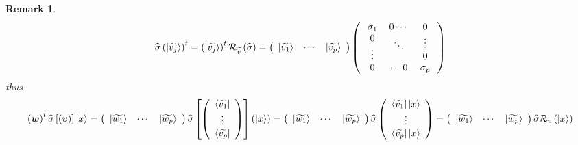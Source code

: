 \documentclass[aps,preprint]{revtex4}
\newtheorem{remark}[theorem]{Remark}
\begin{document}
\begin{remark}
\begin{equation}
\widehat{\sigma }\left( \left\vert \widetilde{v_{j}}\right\rangle \right)
^{t}=\left( \left\vert \widetilde{v_{j}}\right\rangle \right) ^{t}\mathcal{R}%
_{\widetilde{v}}\left( \widehat{\sigma }\right) =\left( 
\begin{array}{ccc}
\left\vert \widetilde{v_{1}}\right\rangle & \cdots & \left\vert \widetilde{%
v_{p}}\right\rangle%
\end{array}%
\right) \left( 
\begin{array}{ccc}
\sigma _{1} & 0\cdots & 0 \\ 
\begin{array}{c}
0 \\ 
\vdots%
\end{array}
& \ddots & 
\begin{array}{c}
\vdots \\ 
0%
\end{array}
\\ 
0 & \cdots 0 & \sigma _{p}%
\end{array}%
\right)
\end{equation}%
thus 
\begin{equation}
\left( \boldsymbol{w}\right) ^{t}\widehat{\sigma }\left[ \left( \boldsymbol{v%
}\right) \right] \left\vert x\right\rangle =\left( 
\begin{array}{ccc}
\left\vert \widetilde{w_{1}}\right\rangle & \cdots & \left\vert \widetilde{%
w_{p}}\right\rangle%
\end{array}%
\right) \widehat{\sigma }\left[ \left( 
\begin{array}{c}
\left\langle \widetilde{v_{1}}\right\vert \\ 
\vdots \\ 
\left\langle \widetilde{v_{p}}\right\vert%
\end{array}%
\right) \right] \left( \left\vert x\right\rangle \right) =\left( 
\begin{array}{ccc}
\left\vert \widetilde{w_{1}}\right\rangle & \cdots & \left\vert \widetilde{%
w_{p}}\right\rangle%
\end{array}%
\right) \widehat{\sigma }\left( 
\begin{array}{c}
\left\langle \widetilde{v_{1}}\right\vert \left\vert x\right\rangle \\ 
\vdots \\ 
\left\langle \widetilde{v_{p}}\right\vert \left\vert x\right\rangle%
\end{array}%
\right) =\left( 
\begin{array}{ccc}
\left\vert \widetilde{w_{1}}\right\rangle & \cdots & \left\vert \widetilde{%
w_{p}}\right\rangle%
\end{array}%
\right) \widehat{\sigma }\mathcal{R}_{v}\left( \left\vert x\right\rangle
\right)
\end{equation}
\end{remark}
\end{document}
